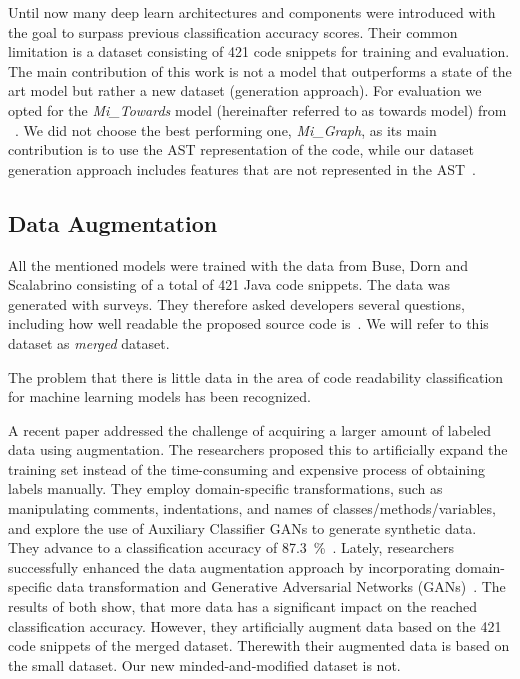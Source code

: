 \documentclass[%
class=scrreprt,
chapterprefix=false,%
open=right,%
twoside=false,%
paper=a4,%
logofile={Logo\_zentral\_farbig\_EN.png},%
thesistype=master,%
UKenglish,%
]{se2thesis}
\theoremstyle{definition}
\newcommand{\numMerged}{421\xspace}
\begin{document}
	Until now many deep learn architectures and components were introduced with the goal to surpass previous classification accuracy scores. Their common limitation is a dataset consisting of \numMerged code snippets for training and evaluation.
	The main contribution of this work is not a model that outperforms a state of the art model but rather a new dataset (generation approach). For evaluation we opted for the \textit{Mi\_Towards} model (hereinafter referred to as towards model) from \citeauthor{mi2022towards}~\cite{mi2022towards}. We did not choose the best performing one, \textit{Mi\_Graph}, as its main contribution is to use the AST representation of the code, while our dataset generation approach includes features that are not represented in the AST~\cite{mi2023graph}.
			
\subsection{Data Augmentation} \label{Data Augmentation}

	All the mentioned models were trained with the data from Buse, Dorn and Scalabrino consisting of a total of \numMerged Java code snippets. The data was generated with surveys. They therefore asked developers several questions, including how well readable the proposed source code is~\cite{buse2009learning, dorn2012general, scalabrino2018comprehensive}. We will refer to this dataset as \textit{merged} dataset.
	
	The problem that there is little data in the area of code readability classification for machine learning models has been recognized.
					
	A recent paper addressed the challenge of acquiring a larger amount of labeled data using augmentation. The researchers proposed this to artificially expand the training set instead of the time-consuming and expensive process of obtaining labels manually. They employ domain-specific transformations, such as manipulating comments, indentations, and names of classes/methods/variables, and explore the use of Auxiliary Classifier GANs to generate synthetic data. They advance to a classification accuracy of 87.3~\%~\cite{mi2021effectiveness}.
	Lately, researchers successfully enhanced the data augmentation approach by incorporating domain-specific data transformation and Generative Adversarial Networks (GANs)~\cite{mi2022enhanced}.
	The results of both show, that more data has a significant impact on the reached classification accuracy. However, they artificially augment data based on the \numMerged code snippets of the merged dataset. Therewith their augmented data is based on the small dataset. Our new minded-and-modified dataset is not.
	
\end{document}
